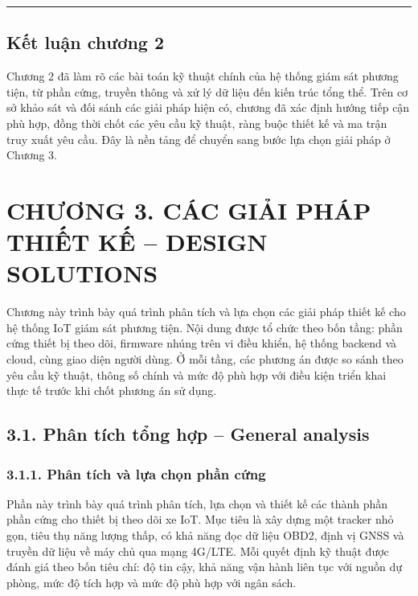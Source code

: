 \documentclass[13pt,a4paper]{extarticle}
\renewcommand{\\}{\thesislongtableorignewline\hline}%
\newcommand{\chapterheading}[1]{\clearpage\section*{#1}\setcounter{subsection}{0}}
\begin{document}
\begin{center}\rule{0.5\linewidth}{0.5pt}\end{center}

\subsection{Kết luận chương
2}\label{kux1ebft-luux1eadn-chux1b0ux1a1ng-2}

Chương 2 đã làm rõ các bài toán kỹ thuật chính của hệ thống giám sát
phương tiện, từ phần cứng, truyền thông và xử lý dữ liệu đến kiến trúc
tổng thể. Trên cơ sở khảo sát và đối sánh các giải pháp hiện có, chương
đã xác định hướng tiếp cận phù hợp, đồng thời chốt các yêu cầu kỹ thuật,
ràng buộc thiết kế và ma trận truy xuất yêu cầu. Đây là nền tảng để
chuyển sang bước lựa chọn giải pháp ở Chương 3.

\chapterheading{CHƯƠNG 3. CÁC GIẢI PHÁP THIẾT KẾ -- DESIGN SOLUTIONS}

Chương này trình bày quá trình phân tích và lựa chọn các giải pháp thiết
kế cho hệ thống IoT giám sát phương tiện. Nội dung được tổ chức theo bốn
tầng: phần cứng thiết bị theo dõi, firmware nhúng trên vi điều khiển, hệ
thống backend và cloud, cùng giao diện người dùng. Ở mỗi tầng, các
phương án được so sánh theo yêu cầu kỹ thuật, thông số chính và mức độ
phù hợp với điều kiện triển khai thực tế trước khi chốt phương án sử
dụng.

\subsection{3.1. Phân tích tổng hợp -- General
analysis}\label{31-phuxe2n-tuxedch-tux1ed5ng-hux1ee3p--general-analysis}

\subsubsection{3.1.1. Phân tích và lựa chọn phần
cứng}\label{311-phuxe2n-tuxedch-vuxe0-lux1ef1a-chux1ecdn-phux1ea7n-cux1ee9ng}

Phần này trình bày quá trình phân tích, lựa chọn và thiết kế các thành
phần phần cứng cho thiết bị theo dõi xe IoT. Mục tiêu là xây dựng một
tracker nhỏ gọn, tiêu thụ năng lượng thấp, có khả năng đọc dữ liệu OBD2,
định vị GNSS và truyền dữ liệu về máy chủ qua mạng 4G/LTE. Mỗi quyết
định kỹ thuật được đánh giá theo bốn tiêu chí: độ tin cậy, khả năng vận
hành liên tục với nguồn dự phòng, mức độ tích hợp và mức độ phù hợp với
ngân sách.
\end{document}
